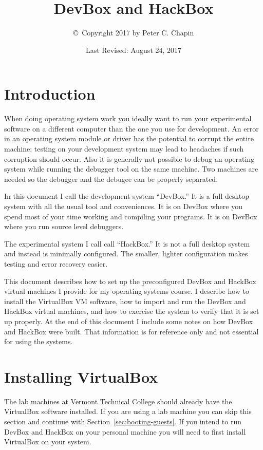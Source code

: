 \documentclass[twocolumn]{article}
\begin{document}
\title{DevBox and HackBox}
\author{\copyright\ Copyright 2017 by Peter C. Chapin}
\date{Last Revised: August 24, 2017}
\maketitle

\tableofcontents

\section{Introduction}

When doing operating system work you ideally want to run your experimental software on a
different computer than the one you use for development. An error in an operating system module
or driver has the potential to corrupt the entire machine; testing on your development system
may lead to headaches if such corruption should occur. Also it is generally not possible to
debug an operating system while running the debugger tool on the same machine. Two machines are
needed so the debugger and the debugee can be properly separated.

In this document I call the development system ``DevBox.'' It is a full desktop system with all
the usual tool and conveniences. It is on DevBox where you spend most of your time working and
compiling your programs. It is on DevBox where you run source level debuggers.

The experimental system I call call ``HackBox.'' It is not a full desktop system and instead is
minimally configured. The smaller, lighter configuration makes testing and error recovery
easier.

This document describes how to set up the preconfigured DevBox and HackBox virtual machines I
provide for my operating systems course. I describe how to install the VirtualBox VM software,
how to import and run the DevBox and HackBox virtual machines, and how to exercise the system to
verify that it is set up properly. At the end of this document I include some notes on how
DevBox and HackBox were built. That information is for reference only and not essential for
using the systems.

\section{Installing VirtualBox}

The lab machines at Vermont Technical College should already have the VirtualBox software
installed. If you are using a lab machine you can skip this section and continue with
Section~\ref{sec:booting-guests}. If you intend to run DevBox and HackBox on your personal
machine you will need to first install VirtualBox on your system.
\end{document}
